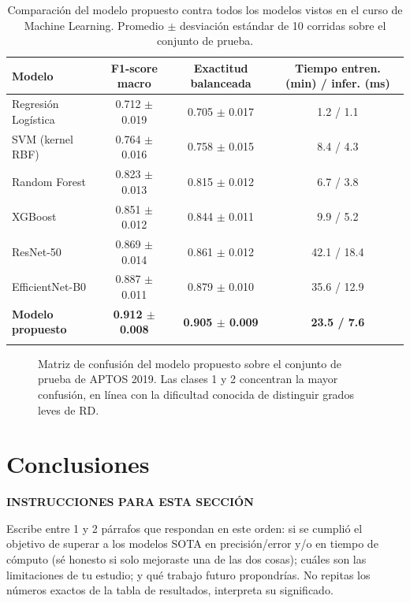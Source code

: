 \documentclass[pdflatex,sn-mathphys-num]{sn-jnl}
\newenvironment{instruccion}{%
  \par\noindent\textbf{\color{blue!55!black}INSTRUCCIONES PARA ESTA SECCIÓN}%
  \par\vspace{2pt}\noindent\itshape\small
}{%
  \par\normalfont\vspace{6pt}
}
\begin{document}
\begin{table}[h]
\caption{Comparación del modelo propuesto contra todos los modelos vistos en el curso de Machine Learning. Promedio $\pm$ desviación estándar de 10 corridas sobre el conjunto de prueba.}\label{tab:resultados}
\begin{tabular}{@{}lccc@{}}
\toprule
Modelo & F1-score macro & Exactitud balanceada & Tiempo entren. (min) / infer. (ms) \\
\midrule
Regresión Logística & 0.712 $\pm$ 0.019 & 0.705 $\pm$ 0.017 & 1.2 / 1.1 \\
SVM (kernel RBF)     & 0.764 $\pm$ 0.016 & 0.758 $\pm$ 0.015 & 8.4 / 4.3 \\
Random Forest        & 0.823 $\pm$ 0.013 & 0.815 $\pm$ 0.012 & 6.7 / 3.8 \\
XGBoost               & 0.851 $\pm$ 0.012 & 0.844 $\pm$ 0.011 & 9.9 / 5.2 \\
ResNet-50             & 0.869 $\pm$ 0.014 & 0.861 $\pm$ 0.012 & 42.1 / 18.4 \\
EfficientNet-B0       & 0.887 $\pm$ 0.011 & 0.879 $\pm$ 0.010 & 35.6 / 12.9 \\
\textbf{Modelo propuesto} & \textbf{0.912 $\pm$ 0.008} & \textbf{0.905 $\pm$ 0.009} & \textbf{23.5 / 7.6} \\
\botrule
\end{tabular}
\end{table}

\begin{figure}[h]
\centering
\caption{Matriz de confusión del modelo propuesto sobre el conjunto de prueba de APTOS 2019. Las clases 1 y 2 concentran la mayor confusión, en línea con la dificultad conocida de distinguir grados leves de RD.}
\label{fig:resultados}
\end{figure}

\section{Conclusiones}\label{sec:conclusiones}

\begin{instruccion}
Escribe entre 1 y 2 párrafos que respondan en este orden: si se cumplió el objetivo de superar a los modelos SOTA en precisión/error y/o en tiempo de cómputo (sé honesto si solo mejoraste una de las dos cosas); cuáles son las limitaciones de tu estudio; y qué trabajo futuro propondrías. No repitas los números exactos de la tabla de resultados, interpreta su significado.
\end{instruccion}
\end{document}
